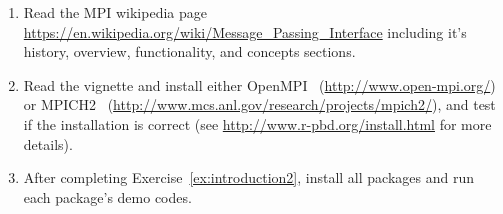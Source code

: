 \begin{enumerate}[label=\thechapter-\arabic*]
\item
Read the MPI wikipedia page \url{https://en.wikipedia.org/wiki/Message_Passing_Interface}
including it's history, overview, functionality, and concepts sections.

\item
Read the  vignette and install either
OpenMPI~ (\url{http://www.open-mpi.org/}) or
MPICH2~
(\url{http://www.mcs.anl.gov/research/projects/mpich2/}),
 and test if the installation is correct (see \url{http://www.r-pbd.org/install.html} for more details).
\label{ex:introduction2}

\item
After completing Exercise~\ref{ex:introduction2},
install all \pbdR packages and run each package's demo codes.
\end{enumerate}

